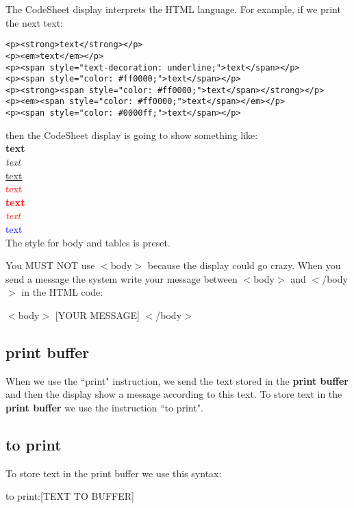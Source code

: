 \documentclass[11pt,a4paper,openright,oneside]{book}
\begin{document}
The CodeSheet display interprets the HTML language. For example, if we print the next text:
\begin{lstlisting}
<p><strong>text</strong></p>
<p><em>text</em></p>
<p><span style="text-decoration: underline;">text</span></p>
<p><span style="color: #ff0000;">text</span></p>
<p><strong><span style="color: #ff0000;">text</span></strong></p>
<p><em><span style="color: #ff0000;">text</span></em></p>
<p><span style="color: #0000ff;">text</span></p>
\end{lstlisting}
then the CodeSheet display is going to show something like: 
\vspace{5px} \\
\textbf{text}\\
\textit{text}\\
\underline{text}\\
\textcolor{red}{text} \\
\textcolor{red}{\textbf{text}}\\
\textcolor{red}{\textit{text}}\\
\textcolor{blue}{text} \\

The \textsf{style} for \textsf{body} and \textsf{tables} is preset. 

You MUST NOT use \textsf{$<$body$>$} because the display could go crazy. When you send a message the system write your message between \textsf{$<$body$>$} and \textsf{$<$/body$>$} in the HTML code:
\begin{center} \textsf{$<$body$>$ \textsc{\scriptsize[YOUR MESSAGE]} $<$/body$>$}\end{center}

\subsection{print buffer}

When we use the ``\textsf{print}" instruction, we send the text stored in the \textbf{print buffer} and then the display show a message according to this text. To store text in the \textbf{print buffer} we use the instruction ``\textsf{to print}".

\subsection{\textsf{to print}}

To store text in the print buffer we use this syntax: 
\begin{center} \textsf{to print:\textsc{\scriptsize[TEXT TO BUFFER]}}\end{center}
\end{document}
